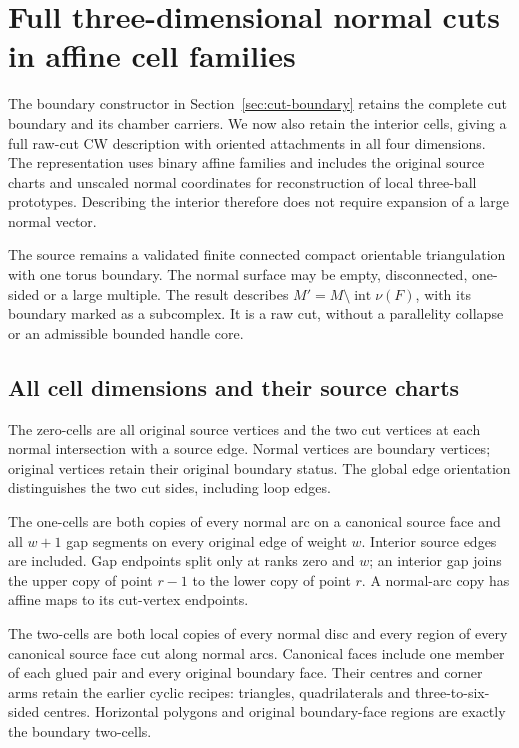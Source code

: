 \section{Full three-dimensional normal cuts in affine cell families}
\label{sec:cut-cells}

The boundary constructor in Section~\ref{sec:cut-boundary} retains the complete
cut boundary and its chamber carriers. We now also retain the interior cells,
giving a full raw-cut CW description with oriented attachments in all four
dimensions. The representation uses binary affine families and includes the
original source charts and unscaled normal coordinates for reconstruction
of local three-ball prototypes. Describing the interior therefore does not
require expansion of a large normal vector.

The source remains a validated finite connected compact orientable
triangulation with one torus boundary. The normal surface may be empty,
disconnected, one-sided or a large multiple. The result describes
$M'=M\setminus\operatorname{int}\nu(F)$, with its boundary marked as a
subcomplex. It is a raw cut, without a parallelity collapse or an admissible
bounded handle core.

\subsection{All cell dimensions and their source charts}

The zero-cells are all original source vertices and the two cut vertices
at each normal intersection with a source edge. Normal vertices are boundary
vertices; original vertices retain their original boundary status. The
global edge orientation distinguishes the two cut sides, including loop edges.

The one-cells are both copies of every normal arc on a canonical source face
and all $w+1$ gap segments on every original edge of weight $w$. Interior
source edges are included. Gap endpoints split only at ranks zero and $w$;
an interior gap joins the upper copy of point $r-1$ to the lower copy of
point $r$. A normal-arc copy has affine maps to its cut-vertex endpoints.

The two-cells are both local copies of every normal disc and every region
of every canonical source face cut along normal arcs. Canonical faces include
one member of each glued pair and every original boundary face. Their centres
and corner arms retain the earlier cyclic recipes: triangles, quadrilaterals
and three-to-six-sided centres. Horizontal polygons and original boundary-face
regions are exactly the boundary two-cells.

